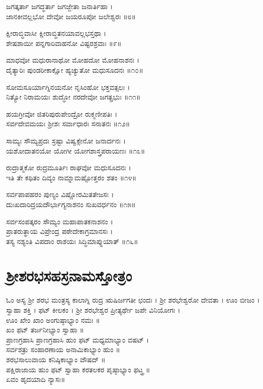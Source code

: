 ಜಗತ್ಕರ್ತಾ ಜಗದ್ಧರ್ತಾ ಜಗಜ್ಜೇತಾ ಜನಾರ್ತಿಹಾ ।\\
ಜಾನಕೀವಲ್ಲಭೋ ದೇವೋ ಜಯರೂಪೋ ಜಲೇಶ್ವರಃ ॥೮॥

ಕ್ಷೀರಾಬ್ಧಿವಾಸೀ ಕ್ಷೀರಾಬ್ಧಿತನಯಾವಲ್ಲಭಸ್ತಥಾ ।\\
ಶೇಷಶಾಯೀ ಪನ್ನಗಾರಿವಾಹನೋ ವಿಷ್ಟರಶ್ರವಾಃ ॥೯॥

ಮಾಧವೋ ಮಧುರಾನಾಥೋ ಮೋಹದೋ ಮೋಹನಾಶನಃ ।\\
ದೈತ್ಯಾರಿಃ ಪುಂಡರೀಕಾಕ್ಷೋ ಹ್ಯಚ್ಯುತೋ ಮಧುಸೂದನಃ ॥೧೦॥

ಸೋಮಸೂರ್ಯಾಗ್ನಿನಯನೋ ನೃಸಿಂಹೋ ಭಕ್ತವತ್ಸಲಃ ।\\
ನಿತ್ಯೋ ನಿರಾಮಯಃ ಶುದ್ಧೋ ನರದೇವೋ ಜಗತ್ಪ್ರಭುಃ ॥೧೧॥

ಹಯಗ್ರೀವೋ ಜಿತರಿಪುರುಪೇಂದ್ರೋ ರುಕ್ಮಣೀಪತಿಃ ।\\
ಸರ್ವದೇವಮಯಃ ಶ್ರೀಶಃ ಸರ್ವಾಧಾರಃ ಸನಾತನಃ ॥೧೨॥

ಸಾಮ್ಯಃ ಸೌಮ್ಯಪ್ರದಃ ಸ್ರಷ್ಟಾ ವಿಷ್ವಕ್ಸೇನೋ ಜನಾರ್ದನಃ ।\\
ಯಶೋದಾತನಯೋ ಯೋಗೀ ಯೋಗಶಾಸ್ತ್ರಪರಾಯಣಃ ॥೧೩॥

ರುದ್ರಾತ್ಮಕೋ ರುದ್ರಮೂರ್ತಿಃ ರಾಘವೋ ಮಧುಸೂದನಃ ।\\
ಇತಿ ತೇ ಕಥಿತಂ ದಿವ್ಯಂ ನಾಮ್ನಾಮಷ್ಟೋತ್ತರಂ ಶತಂ ॥೧೪॥

ಸರ್ವಪಾಪಹರಂ ಪುಣ್ಯಂ ವಿಷ್ಣೋರಮಿತತೇಜಸಃ ।\\
ದುಃಖದಾರಿದ್ರಯದೌರ್ಭಾಗ್ಯನಾಶನಂ ಸುಖವರ್ಧನಂ ॥೧೫॥

ಸರ್ವಸಂಪತ್ಕರಂ ಸೌಮ್ಯಂ ಮಹಾಪಾತಕನಾಶನಂ ।\\
ಪ್ರಾತರುತ್ಥಾಯ ವಿಪ್ರೇಂದ್ರ ಪಠೇದೇಕಾಗ್ರಮಾನಸಃ ।\\
ತಸ್ಯ ನಶ್ಯಂತಿ ವಿಪದಾಂ ರಾಶಯಃ ಸಿದ್ಧಿಮಾಪ್ನುಯಾತ್ ॥೧೬॥

\section{ಶ್ರೀಶರಭಸಹಸ್ರನಾಮಸ್ತೋತ್ರಂ}


ಓಂ ಅಸ್ಯ ಶ್ರೀ ಶರಭ ಮಂತ್ರಸ್ಯ ಕಾಲಾಗ್ನಿ ರುದ್ರ ಋಷಿರ್ಜಗತೀ ಛಂದಃ । ಶ್ರೀ ಶರಭೇಶ್ವರೋ ದೇವತಾ । ಊಂ ಬೀಜಂ । ಸ್ವಾಹಾ ಶಕ್ತಿ । ಫಟ್ ಕೀಲಕಂ । ಶ್ರೀ ಶರಭೇಶ್ವರ ಪ್ರೀತ್ಯರ್ಥೇ ಜಪೇ ವಿನಿಯೋಗಃ ।\\
ಊಂ ಖೇಂ ಖಾಂ ಅಂಗುಷ್ಠಾಭ್ಯಾಂ ನಮಃ ॥\\
ಖಂ ಫಟ್ ತರ್ಜನೀಭ್ಯಾಂ ಸ್ವಾಹಾ ॥\\
ಪ್ರಾಣಗ್ರಹಾಸಿ ಪ್ರಾಣಗ್ರಹಾಸಿ ಹುಂ ಫಟ್ ಮಧ್ಯಮಾಭ್ಯಾಂ ವಷಟ್ ।\\
ಸರ್ವಶತ್ರು ಸಂಹಾರಣಾಯ ಅನಾಮಿಕಾಭ್ಯಾಂ ಹುಂ ॥\\
ಶರಭಸಾಲುವಾಯ ಕನಿಷ್ಠಿಕಾಭ್ಯಾಂ ವೌಷದ್ ॥\\
ಪಕ್ಷಿರಾಜಾಯ ಹುಂ ಫಟ್ ಸ್ವಾಹಾ ಕರತಲಕರ ಪೃಷ್ಠಾಭ್ಯಾಂ ಫಟ್ತ್ರ ॥\\
ಏವಂ ಹೃದಯಾದಿ ನ್ಯಾಸಃ॥

